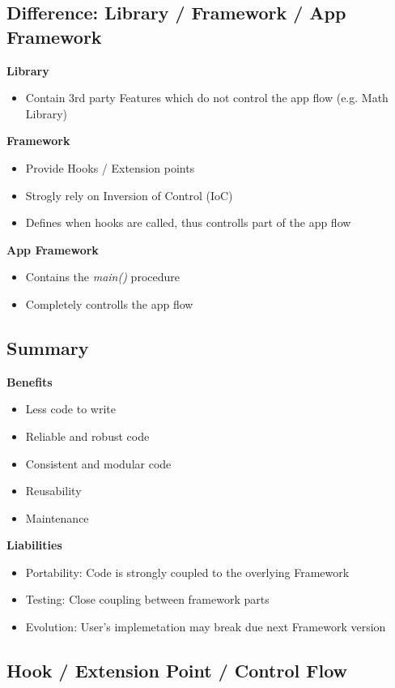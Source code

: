 \subsection{Difference: Library / Framework / App Framework}
\textbf{Library}
\begin{itemize}
    \item Contain 3rd party Features which do not control the app flow (e.g. Math Library)
\end{itemize}
\textbf{Framework}
\begin{itemize}
    \item Provide Hooks / Extension points
    \item Strogly rely on Inversion of Control (IoC)
    \item Defines when hooks are called, thus controlls part of the app flow
\end{itemize}
\textbf{App Framework}
\begin{itemize}
    \item Contains the \textit{main()} procedure
    \item Completely controlls the app flow
\end{itemize}

\subsection{Summary}
\textbf{Benefits}
\begin{itemize}
    \item Less code to write
    \item Reliable and robust code
    \item Consistent and modular code
    \item Reusability
    \item Maintenance
\end{itemize}
\textbf{Liabilities}
\begin{itemize}
    \item Portability: Code is strongly coupled to the overlying Framework 
    \item Testing: Close coupling between framework parts
    \item Evolution: User's implemetation may break due next Framework version
\end{itemize}

\subsection{Hook / Extension Point / Control Flow}
